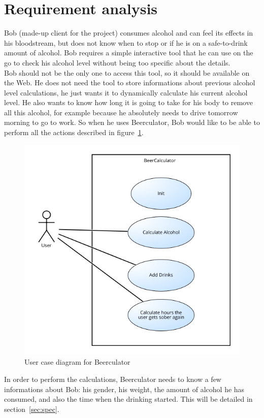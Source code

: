\section{Requirement analysis}
\label{sec:req}

Bob (made-up client for the project) consumes alcohol and can feel its effects in his bloodstream, but does not know when to stop or if he is on a safe-to-drink amount of alcohol. Bob requires a simple interactive tool that he can use on the go to check his alcohol level without being too specific about the details.\\
  
Bob should not be the only one to access this tool, so it should be available on the Web. He does not need the tool to store informations about previous alcohol level calculations, he just wants it to dynamically calculate his current alcohol level. He also wants to know how long it is going to take for his body to remove all this alcohol, for example because he absolutely needs to drive tomorrow morning to go to work. So when he uses Beerculator, Bob would like to be able to perform all the actions described in {\sc figure}~\ref{fig:useCase}.\\

\begin{figure}[H]
\centering
   \includegraphics[scale=0.8]{./figures/UseCase.png}
   \caption{User case diagram for Beerculator}
   \label{fig:useCase}
\end{figure}

In order to perform the calculations, Beerculator needs to know a few informations about Bob: his gender, his weight, the amount of alcohol he has consumed, and also the time when the drinking started. This will be detailed in {\sc section}~\ref{sec:spec}.